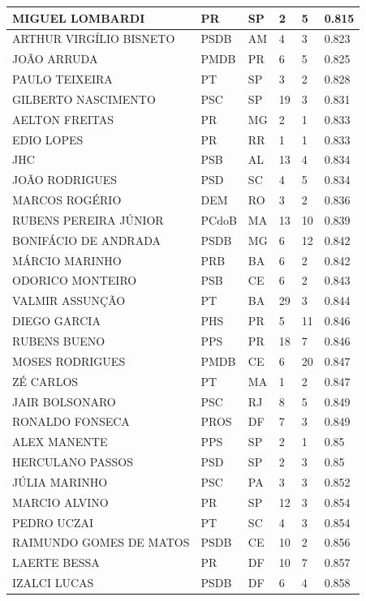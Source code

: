 \begin{apendicesenv}
\begin{longtable}{|L{4cm}|C{2cm}|C{1cm}|C{2cm}|C{1cm}|C{2cm}|}
MIGUEL LOMBARDI & PR & SP & 2 & 5 & 0.815 \\ \hline
ARTHUR VIRGÍLIO BISNETO & PSDB & AM & 4 & 3 & 0.823 \\ \hline
JOÃO ARRUDA & PMDB & PR & 6 & 5 & 0.825 \\ \hline
PAULO TEIXEIRA & PT & SP & 3 & 2 & 0.828 \\ \hline
GILBERTO NASCIMENTO & PSC & SP & 19 & 3 & 0.831 \\ \hline
AELTON FREITAS & PR & MG & 2 & 1 & 0.833 \\ \hline
EDIO LOPES & PR & RR & 1 & 1 & 0.833 \\ \hline
JHC & PSB & AL & 13 & 4 & 0.834 \\ \hline
JOÃO RODRIGUES & PSD & SC & 4 & 5 & 0.834 \\ \hline
MARCOS ROGÉRIO & DEM & RO & 3 & 2 & 0.836 \\ \hline
RUBENS PEREIRA JÚNIOR & PCdoB & MA & 13 & 10 & 0.839 \\ \hline
BONIFÁCIO DE ANDRADA & PSDB & MG & 6 & 12 & 0.842 \\ \hline
MÁRCIO MARINHO & PRB & BA & 6 & 2 & 0.842 \\ \hline
ODORICO MONTEIRO & PSB & CE & 6 & 2 & 0.843 \\ \hline
VALMIR ASSUNÇÃO & PT & BA & 29 & 3 & 0.844 \\ \hline
DIEGO GARCIA & PHS & PR & 5 & 11 & 0.846 \\ \hline
RUBENS BUENO & PPS & PR & 18 & 7 & 0.846 \\ \hline
MOSES RODRIGUES & PMDB & CE & 6 & 20 & 0.847 \\ \hline
ZÉ CARLOS & PT & MA & 1 & 2 & 0.847 \\ \hline
JAIR BOLSONARO & PSC & RJ & 8 & 5 & 0.849 \\ \hline
RONALDO FONSECA & PROS & DF & 7 & 3 & 0.849 \\ \hline
ALEX MANENTE & PPS & SP & 2 & 1 & 0.85 \\ \hline
HERCULANO PASSOS & PSD & SP & 2 & 3 & 0.85 \\ \hline
JÚLIA MARINHO & PSC & PA & 3 & 3 & 0.852 \\ \hline
MARCIO ALVINO & PR & SP & 12 & 3 & 0.854 \\ \hline
PEDRO UCZAI & PT & SC & 4 & 3 & 0.854 \\ \hline
RAIMUNDO GOMES DE MATOS & PSDB & CE & 10 & 2 & 0.856 \\ \hline
LAERTE BESSA & PR & DF & 10 & 7 & 0.857 \\ \hline
IZALCI LUCAS & PSDB & DF & 6 & 4 & 0.858 \\ \hline

\end{longtable}
\end{apendicesenv}
